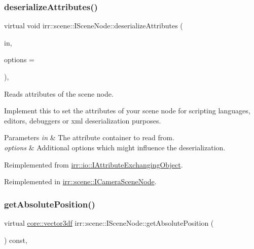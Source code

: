 \subsubsection{\texorpdfstring{deserialize\+Attributes()}{deserializeAttributes()}}
{\footnotesize\ttfamily virtual void irr\+::scene\+::\+I\+Scene\+Node\+::deserialize\+Attributes (\begin{DoxyParamCaption}\item[{\hyperlink{classirr_1_1io_1_1IAttributes}{io\+::\+I\+Attributes} $\ast$}]{in,  }\item[{\hyperlink{structirr_1_1io_1_1SAttributeReadWriteOptions}{io\+::\+S\+Attribute\+Read\+Write\+Options} $\ast$}]{options = {} }\end{DoxyParamCaption})\hspace{0.3cm}{\ttfamily [inline]}, {\ttfamily [virtual]}}



Reads attributes of the scene node. 

Implement this to set the attributes of your scene node for scripting languages, editors, debuggers or xml deserialization purposes. 
\begin{DoxyParams}{Parameters}
{\em in} & The attribute container to read from. \\
\hline
{\em options} & Additional options which might influence the deserialization. \\
\hline
\end{DoxyParams}


Reimplemented from \hyperlink{classirr_1_1io_1_1IAttributeExchangingObject_a013d4ead3736d7fab4bc18c2d61a3e2e}{irr\+::io\+::\+I\+Attribute\+Exchanging\+Object}.



Reimplemented in \hyperlink{classirr_1_1scene_1_1ICameraSceneNode_a0df881cb5e2a55562399281061151ae8}{irr\+::scene\+::\+I\+Camera\+Scene\+Node}.

\mbox{\label{classirr_1_1scene_1_1ISceneNode_a09a1c2ce3cf5448197a0c7b0bb16a516}} 
\subsubsection{\texorpdfstring{get\+Absolute\+Position()}{getAbsolutePosition()}}
{\footnotesize\ttfamily virtual \hyperlink{namespaceirr_1_1core_a06f169d08b5c429f5575acb7edbad811}{core\+::vector3df} irr\+::scene\+::\+I\+Scene\+Node\+::get\+Absolute\+Position (\begin{DoxyParamCaption}{ }\end{DoxyParamCaption}) const\hspace{0.3cm}{\ttfamily [inline]}, {\ttfamily [virtual]}}




